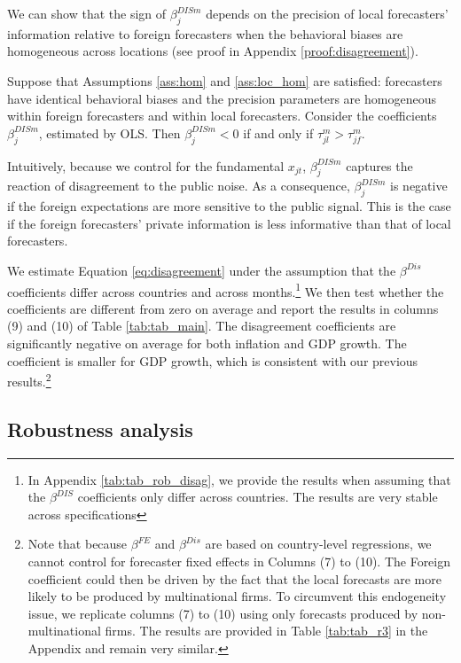 We can show that the sign of $\beta^{DISm}_{j}$ depends on the precision of local forecasters' information relative to foreign forecasters when the behavioral biases are homogeneous across locations (see proof in Appendix \ref{proof:disagreement}).
\begin{prop}\label{prop:disagreement} Suppose that Assumptions \ref{ass:hom} and \ref{ass:loc_hom} are satisfied: forecasters have identical behavioral biases and the precision parameters are homogeneous within foreign forecasters and within local forecasters. Consider the coefficients $\beta^{DISm}_{j}$, estimated by OLS. Then $\beta^{DISm}_{j}<0$ if and only if $\tau_{jl}^m>\tau_{jf}^m$.
\end{prop}
Intuitively, because we control for the fundamental $x_{jt}$, $\beta^{DISm}_{j}$ captures the reaction of disagreement to the public noise. As a consequence, $\beta^{DISm}_{j}$ is negative if the foreign expectations are more sensitive to the public signal. This is the case if the foreign forecasters' private information is less informative than that of local forecasters.

We estimate Equation \eqref{eq:disagreement} under the assumption that the $\beta^{Dis}$ coefficients differ across countries and across months.\footnote{In Appendix \ref{tab:tab_rob_disag}, we provide the results when assuming that the $\beta^{DIS}$ coefficients only differ across countries. The results are very stable across specifications} We then test whether the coefficients are different from zero on average and report the results in columns (9) and (10) of Table \ref{tab:tab_main}. The disagreement coefficients are significantly negative on average for both inflation and GDP growth. The coefficient is smaller for GDP growth, which is consistent with our previous results.\footnote{Note that because $\beta^{FE}$ and $\beta^{Dis}$ are based on country-level regressions, we cannot control for forecaster fixed effects in Columns (7) to (10). The Foreign coefficient could then be driven by the fact that the local forecasts are more likely to be produced by multinational firms. To circumvent this endogeneity issue, we replicate columns (7) to (10) using only forecasts produced by non-multinational firms. The results are provided in Table \ref{tab:tab_r3} in the Appendix and remain very similar.}

\subsection{Robustness analysis}

